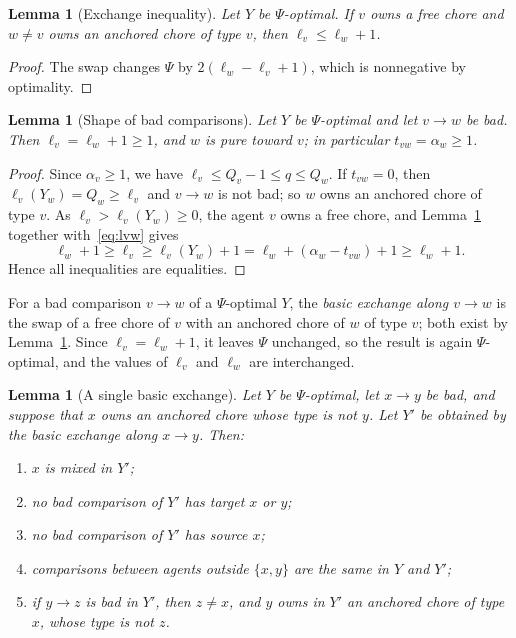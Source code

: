 \documentclass{amsart}
\numberwithin{equation}{section}
\newtheorem{lemma}[theorem]{Lemma}
\theoremstyle{definition}
\theoremstyle{remark}
\begin{document}
\begin{lemma}[Exchange inequality]\label{lem:EI}
Let $Y$ be $\Psi$-optimal. If $v$ owns a free chore and $w\ne v$ owns an anchored chore of type $v$, then $\ell_v\le\ell_w+1$.
\end{lemma}

\begin{proof}
The swap changes $\Psi$ by $2(\ell_w-\ell_v+1)$, which is nonnegative by optimality.
\end{proof}

\begin{lemma}[Shape of bad comparisons]\label{lem:shape}
Let $Y$ be $\Psi$-optimal and let $v\to w$ be bad. Then $\ell_v=\ell_w+1\ge 1$, and $w$ is pure toward $v$; in particular $t_{vw}=\alpha_w\ge1$.
\end{lemma}

\begin{proof}
Since $\alpha_v\ge1$, we have $\ell_v\le Q_v-1\le q\le Q_w$. If $t_{vw}=0$, then $\ell_v(Y_w)=Q_w\ge\ell_v$ and $v\to w$ is not bad; so $w$ owns an anchored chore of type $v$. As $\ell_v>\ell_v(Y_w)\ge0$, the agent $v$ owns a free chore, and Lemma~\ref{lem:EI} together with~\eqref{eq:lvw} gives
\[
\ell_w+1\ge\ell_v\ge\ell_v(Y_w)+1=\ell_w+(\alpha_w-t_{vw})+1\ge\ell_w+1 .
\]
Hence all inequalities are equalities.
\end{proof}

For a bad comparison $v\to w$ of a $\Psi$-optimal $Y$, the \emph{basic exchange along $v\to w$} is the swap of a free chore of $v$ with an anchored chore of $w$ of type $v$; both exist by Lemma~\ref{lem:shape}. Since $\ell_v=\ell_w+1$, it leaves $\Psi$ unchanged, so the result is again $\Psi$-optimal, and the values of $\ell_v$ and $\ell_w$ are interchanged.

\begin{lemma}[A single basic exchange]\label{lem:oneexchange}
Let $Y$ be $\Psi$-optimal, let $x\to y$ be bad, and suppose that $x$ owns an anchored chore whose type is not $y$. Let $Y'$ be obtained by the basic exchange along $x\to y$. Then:
\begin{enumerate}[label=\textup{(\alph*)}]
\item $x$ is mixed in $Y'$;
\item no bad comparison of $Y'$ has target $x$ or $y$;
\item no bad comparison of $Y'$ has source $x$;
\item comparisons between agents outside $\{x,y\}$ are the same in $Y$ and $Y'$;
\item if $y\to z$ is bad in $Y'$, then $z\ne x$, and $y$ owns in $Y'$ an anchored chore of type $x$, whose type is not $z$.
\end{enumerate}
\end{lemma}
\end{document}
